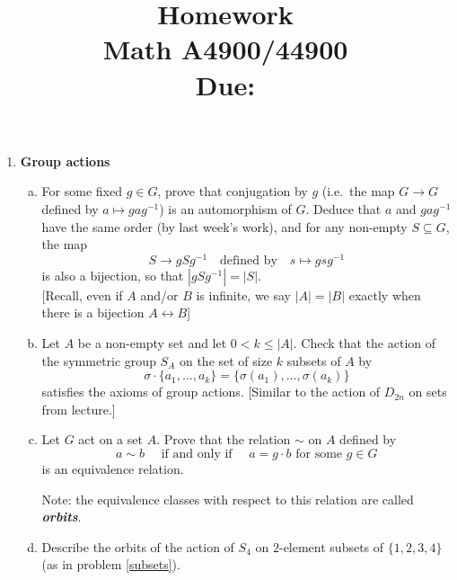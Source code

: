\documentclass[11pt, reqno]{amsart}
\title[Homework \HW]{Homework \HW \\
Math A4900/44900\\
\small Due: \DUE}
\author{}
\theoremstyle{plain}
\theoremstyle{definition}
\theoremstyle{example}
\def\HW{3}
\def\DUE{9/25/2020}
\begin{document}
\maketitle %





\begin{enumerate}[1.]
\item {\bf Group actions}

\begin{enumerate}[(a)] 
\item For some fixed $g \in G$, prove that conjugation by $g$ (i.e.\ the map $G \to G$ defined by $a \mapsto gag^{-1}$) is an automorphism of $G$. Deduce that $a$ and $gag^{-1}$ have the same order (by last week's work), and for any non-empty $S \subseteq G$, the map 
$$S \to gSg^{-1} \quad \text{defined by} \quad s \mapsto gsg^{-1}$$
is also a bijection, so that $|gSg^{-1}| = |S|$. \\
{\small[Recall, even if $A$ and/or $B$ is infinite, we say $|A| = |B|$ exactly when there is a bijection  $A \leftrightarrow B$]}
\item \label{subsets} 
Let $A$ be a non-empty set and let $0<k \leq |A|$. Check that the action of the  symmetric group $S_A$  on the set of size $k$ subsets of $A$ by 
$$\sigma\cdot \{a_1, \dots, a_k\} = \{\sigma(a_1), \dots, \sigma(a_k)\}$$
satisfies the axioms of group actions. \hfill {\small[Similar to the action of $D_{2n}$ on sets from lecture.]}

\item 
 Let $G$ act on a set $A$. Prove that the relation $\sim$ on $A$ defined by 
$$a \sim b \quad  \text{ if and only if } \quad  a = g \cdot b \text{ for some } g \in G$$
is an equivalence relation. 

\smallskip

Note: the equivalence classes with respect to this relation are called \emph{\bf orbits}.

\item Describe the orbits of the action of $S_4$ on $2$-element subsets of $\{1,2,3,4\}$ (as in problem \ref{subsets}).


\end{enumerate}
\end{enumerate}
\end{document}

